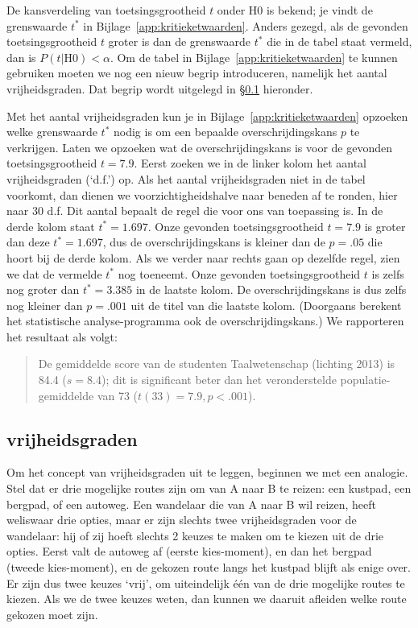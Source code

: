 \documentclass[
]{book}
\begin{document}
De kansverdeling van toetsingsgrootheid \(t\) onder H0 is bekend; je vindt
de grenswaarde \(t^*\) in
Bijlage~\ref{app:kritieketwaarden}. Anders gezegd, als de gevonden
toetsingsgrootheid \(t\) groter is dan de grenswaarde \(t^*\) die in de
tabel staat vermeld, dan is \(P(t|\textrm{H0})<\alpha\). Om de tabel in
Bijlage~\ref{app:kritieketwaarden} te kunnen gebruiken moeten we nog een
nieuw begrip introduceren, namelijk het aantal vrijheidsgraden. Dat
begrip wordt uitgelegd in
§\ref{sec:ttoets-vrijheidsgraden} hieronder.

Met het aantal vrijheidsgraden kun je in
Bijlage~\ref{app:kritieketwaarden} opzoeken welke grenswaarde \(t^*\) nodig
is om een bepaalde overschrijdingskans \(p\) te verkrijgen. Laten we
opzoeken wat de overschrijdingskans is voor de gevonden
toetsingsgrootheid \(t=7.9\). Eerst zoeken we in de linker kolom het
aantal vrijheidsgraden (`d.f.') op. Als het aantal vrijheidsgraden niet
in de tabel voorkomt, dan dienen we voorzichtigheidshalve naar beneden
af te ronden, hier naar 30 d.f. Dit aantal bepaalt de regel die voor ons
van toepassing is. In de derde kolom staat \(t^*=1.697\). Onze gevonden
toetsingsgrootheid \(t=7.9\) is groter dan deze \(t^*=1.697\), dus de
overschrijdingskans is kleiner dan de \(p=.05\) die hoort bij de derde
kolom. Als we verder naar rechts gaan op dezelfde regel, zien we dat de
vermelde \(t^*\) nog toeneemt. Onze gevonden toetsingsgrootheid \(t\) is
zelfs nog groter dan \(t^*=3.385\) in de laatste kolom. De
overschrijdingskans is dus zelfs nog kleiner dan \(p=.001\) uit de titel
van die laatste kolom. (Doorgaans berekent het statistische
analyse-programma ook de overschrijdingskans.) We rapporteren het
resultaat als volgt:

\begin{quote}
De gemiddelde score van de studenten Taalwetenschap (lichting 2013) is
84.4 (\(s=8.4\)); dit is significant beter dan het veronderstelde
populatie-gemiddelde van 73 (\(t(33)=7.9, p<.001\)).
\end{quote}

\hypertarget{sec:ttoets-vrijheidsgraden}{%
\subsection{vrijheidsgraden}\label{sec:ttoets-vrijheidsgraden}}

Om het concept van vrijheidsgraden uit te leggen, beginnen we met een
analogie. Stel dat er drie mogelijke routes zijn om van A naar B te
reizen: een kustpad, een bergpad, of een autoweg. Een wandelaar die van
A naar B wil reizen, heeft weliswaar drie opties, maar er zijn slechts
twee vrijheidsgraden voor de wandelaar: hij of zij hoeft slechts 2
keuzes te maken om te kiezen uit de drie opties. Eerst valt de autoweg
af (eerste kies-moment), en dan het bergpad (tweede kies-moment), en de
gekozen route langs het kustpad blijft als enige over. Er zijn dus twee
keuzes `vrij', om uiteindelijk één van de drie mogelijke routes te
kiezen. Als we de twee keuzes weten, dan kunnen we daaruit afleiden
welke route gekozen moet zijn.
\end{document}
